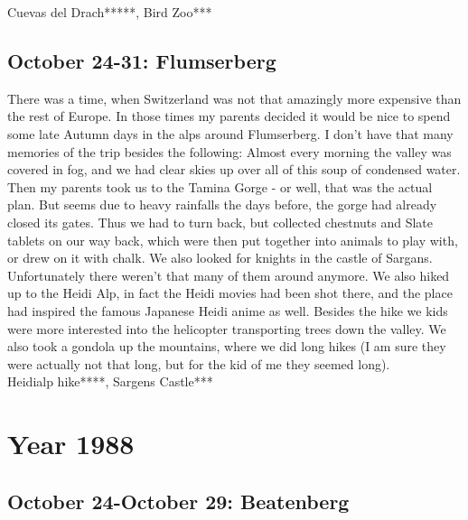 Cuevas del Drach*****, Bird Zoo***

\section{October 24-31: Flumserberg}
\label{1987:Flums}

There was a time, when Switzerland was not that amazingly more expensive than the rest of Europe. In those times my parents decided it would be nice to spend some late Autumn days in the alps around Flumserberg. I don't have that many memories of the trip besides the following: Almost every morning the valley was covered in fog, and we had clear skies up over all of this soup of condensed water. Then my parents took us to the Tamina Gorge - or well, that was the actual plan. But seems due to heavy rainfalls the days before, the gorge had already closed its gates. Thus we had to turn back, but collected chestnuts and Slate tablets on our way back, which were then put together into animals to play with, or drew on it with chalk. We also looked for knights in the castle of Sargans. Unfortunately there weren't that many of them around anymore. We also hiked up to the Heidi Alp, in fact the Heidi movies had been shot there, and the place had inspired the famous Japanese Heidi anime as well. Besides the hike we kids were more interested into the helicopter transporting trees down the valley. We also took a gondola up the mountains, where we did long hikes (I am sure they were actually not that long, but for the kid of me they seemed long). \\

Heidialp hike****, Sargens Castle***

\chapter{Year 1988}
\label{1988}


\section{October 24-October 29: Beatenberg}
\label{1988:Beatenberg}

